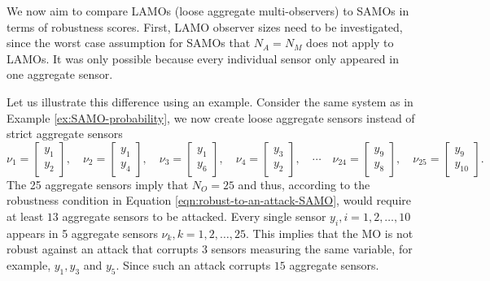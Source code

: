 We now aim to compare LAMOs (loose aggregate multi-observers) to SAMOs in terms of robustness scores. First, LAMO observer sizes need to be investigated, since the worst case assumption for SAMOs that $N_A=N_M$ does not apply to LAMOs. It was only possible because every individual sensor only appeared in one aggregate sensor. 

\begin{example}\label{ex:LAMO-attack}
    Let us illustrate this difference using an example. Consider the same system as in Example \ref{ex:SAMO-probability}, we now create loose aggregate sensors instead of strict aggregate sensors
    \begin{equation}
        \nu_1 = 
        \begin{bmatrix}
            y_1 \\ y_2
        \end{bmatrix}, \quad
        \nu_2 = 
        \begin{bmatrix}
            y_1 \\ y_4
        \end{bmatrix}, \quad
        \nu_3 = 
        \begin{bmatrix}
            y_1 \\ y_6
        \end{bmatrix}, \quad
        \nu_4 =
        \begin{bmatrix}
            y_3 \\ y_2
        \end{bmatrix}, \quad \cdots \quad
        \nu_{24} = 
        \begin{bmatrix}
            y_9 \\ y_{8}
        \end{bmatrix}, \quad
        \nu_{25} =
        \begin{bmatrix}
            y_9 \\ y_{10}
        \end{bmatrix}.
    \end{equation}
    The 25 aggregate sensors imply that $N_O=25$ and thus, according to the robustness condition in Equation \eqref{eqn:robust-to-an-attack-SAMO}, would require at least $13$ aggregate sensors to be attacked. Every single sensor $y_i,i=1,2,\dots,10$ appears in 5 aggregate sensors $\nu_k,k=1,2,\dots,25$. This implies that the MO is not robust against an attack that corrupts 3 sensors measuring the same variable, for example, $y_1, y_3$ and $y_5$. Since such an attack corrupts $15$ aggregate sensors.
\end{example}

